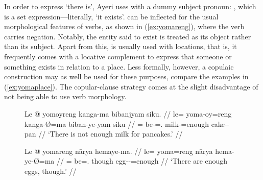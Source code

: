 In order to express `there is', Ayeri uses  with a dummy
subject pronoun: , which is a set
expression---literally, `it exists'.  can be inflected for the usual morphological
features of verbs, as shown in (\ref{ex:yomareng}), where the verb carries
negation. Notably, the entity said to exist is treated as its object rather than its subject.
Apart from this,  is usually used with locations,
that is, it frequently comes with a locative complement to express that someone
or something exists in relation to a place. Less formally, however, a copulaic
construction may as well be used for these purposes, compare the examples in
(\ref{ex:yomaplace}). The copular-clause strategy comes at the slight
disadvantage of not being able to use verb morphology.

\begin{figure}
\pex\label{ex:yomareng}
\a\label{ex:yomareng_sg}\begingl
	\gla Le @ yomoyreng kanga-ma bibanjyam siku. //
	\glb le= yoma-oy=reng kanga-Ø=ma biban-ye-yam siku //
	\glc \PatTI{}= be-\Neg{}=\TsgI{}.\Aarg{} milk-\Top{}=enough
		cake-\Pl{}-\Dat {} pan //
	\glft `There is not enough milk for pancakes.' //
\endgl

\a\label{ex:yomareng_pl}\begingl
	\gla Le @ yomareng nārya hemaye-ma. //
	\glb le= yoma=reng nārya hema-ye-Ø=ma //
	\glc \PatTI{}= be=\TsgI{}.\Aarg{} though egg-\Pl{}-\Top{}=enough //
	\glft `There are enough eggs, though.' //
\endgl
\xe
\end{figure}

